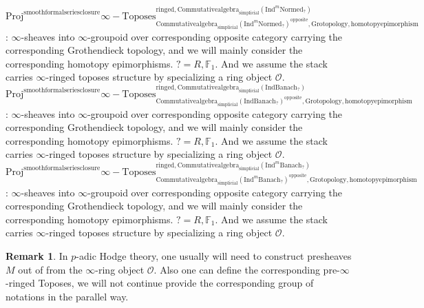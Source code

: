 \documentclass[11pt]{book}
\theoremstyle{definition}
\newtheorem{remark}[theorem]{Remark}
\numberwithin{equation}{section}
\begin{document}
\noindent $\mathrm{Proj}^\text{smoothformalseriesclosure}\infty-\mathrm{Toposes}^{\mathrm{ringed},\mathrm{Commutativealgebra}_{\mathrm{simplicial}}(\mathrm{Ind}^m\mathrm{Normed}_?)}_{\mathrm{Commutativealgebra}_{\mathrm{simplicial}}(\mathrm{Ind}^m\mathrm{Normed}_?)^\mathrm{opposite},\mathrm{Grotopology,homotopyepimorphism}}$: $\infty$-sheaves into $\infty$-groupoid over corresponding opposite category carrying the corresponding Grothendieck topology, and we will mainly consider the corresponding homotopy epimorphisms. $?=R,\mathbb{F}_1$. And we assume the stack carries $\infty$-ringed toposes structure by specializing a ring object $\mathcal{O}$.\\
\noindent $\mathrm{Proj}^\text{smoothformalseriesclosure}\infty-\mathrm{Toposes}^{\mathrm{ringed},\mathrm{Commutativealgebra}_{\mathrm{simplicial}}(\mathrm{Ind}\mathrm{Banach}_?)}_{\mathrm{Commutativealgebra}_{\mathrm{simplicial}}(\mathrm{Ind}\mathrm{Banach}_?)^\mathrm{opposite},\mathrm{Grotopology,homotopyepimorphism}}$: $\infty$-sheaves into $\infty$-groupoid over corresponding opposite category carrying the corresponding Grothendieck topology, and we will mainly consider the corresponding homotopy epimorphisms. $?=R,\mathbb{F}_1$. And we assume the stack carries $\infty$-ringed toposes structure by specializing a ring object $\mathcal{O}$.\\
\noindent $\mathrm{Proj}^\text{smoothformalseriesclosure}\infty-\mathrm{Toposes}^{\mathrm{ringed},\mathrm{Commutativealgebra}_{\mathrm{simplicial}}(\mathrm{Ind}^m\mathrm{Banach}_?)}_{\mathrm{Commutativealgebra}_{\mathrm{simplicial}}(\mathrm{Ind}^m\mathrm{Banach}_?)^\mathrm{opposite},\mathrm{Grotopology,homotopyepimorphism}}$: $\infty$-sheaves into $\infty$-groupoid over corresponding opposite category carrying the corresponding Grothendieck topology, and we will mainly consider the corresponding homotopy epimorphisms. $?=R,\mathbb{F}_1$. And we assume the stack carries $\infty$-ringed toposes structure by specializing a ring object $\mathcal{O}$.\\ 




\begin{remark}
In $p$-adic Hodge theory, one usually will need to construct presheaves $M$ out of from the $\infty$-ring object $\mathcal{O}$.	Also one can define the corresponding pre-$\infty$-ringed Toposes, we will not continue provide the corresponding group of notations in the parallel way. 
\end{remark}
\end{document}
